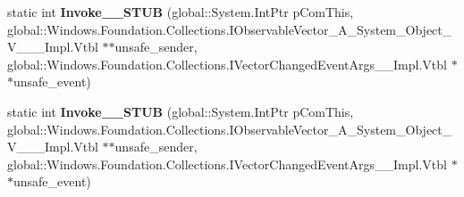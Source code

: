 \begin{DoxyCompactItemize}
\item 
\mbox{\label{struct_windows_1_1_foundation_1_1_collections_1_1_vector_changed_event_handler___a___system___object___v_______impl_1_1_vtbl_aad92b0e62192f767e2a0a193efec22f4}} 
static int {\bfseries Invoke\+\_\+\+\_\+\+S\+T\+UB} (global\+::\+System.\+Int\+Ptr p\+Com\+This, global\+::\+Windows.\+Foundation.\+Collections.\+I\+Observable\+Vector\+\_\+\+A\+\_\+\+System\+\_\+\+Object\+\_\+\+V\+\_\+\+\_\+\+\_\+\+Impl.\+Vtbl $\ast$$\ast$unsafe\+\_\+sender, global\+::\+Windows.\+Foundation.\+Collections.\+I\+Vector\+Changed\+Event\+Args\+\_\+\+\_\+\+Impl.\+Vtbl $\ast$$\ast$unsafe\+\_\+event)
\item 
\mbox{\label{struct_windows_1_1_foundation_1_1_collections_1_1_vector_changed_event_handler___a___system___object___v_______impl_1_1_vtbl_aad92b0e62192f767e2a0a193efec22f4}} 
static int {\bfseries Invoke\+\_\+\+\_\+\+S\+T\+UB} (global\+::\+System.\+Int\+Ptr p\+Com\+This, global\+::\+Windows.\+Foundation.\+Collections.\+I\+Observable\+Vector\+\_\+\+A\+\_\+\+System\+\_\+\+Object\+\_\+\+V\+\_\+\+\_\+\+\_\+\+Impl.\+Vtbl $\ast$$\ast$unsafe\+\_\+sender, global\+::\+Windows.\+Foundation.\+Collections.\+I\+Vector\+Changed\+Event\+Args\+\_\+\+\_\+\+Impl.\+Vtbl $\ast$$\ast$unsafe\+\_\+event)
\end{DoxyCompactItemize}
